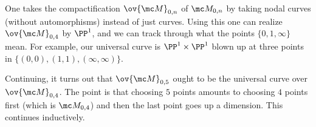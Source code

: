 \documentclass{article}
\begin{document}
\begin{remark}
	One takes the compactification $\ov{\mc M}_{0,n}$ of $\mc M_{0,n}$ by taking nodal curves (without automorphisms) instead of just curves. Using this one can realize $\ov{\mc M}_{0,4}$ by $\PP^1$, and we can track through what the points $\{0,1,\infty\}$ mean. For example, our universal curve is $\PP^1\times\PP^1$ blown up at three points in $\{(0,0),(1,1),(\infty,\infty)\}$.
\end{remark}
\begin{remark}
	Continuing, it turns out that $\ov{\mc M}_{0,5}$ ought to be the universal curve over $\ov{\mc M}_{0,4}$. The point is that choosing $5$ points amounts to choosing $4$ points first (which is $\mc M_{0,4}$) and then the last point goes up a dimension. This continues inductively.
\end{remark}
\end{document}
